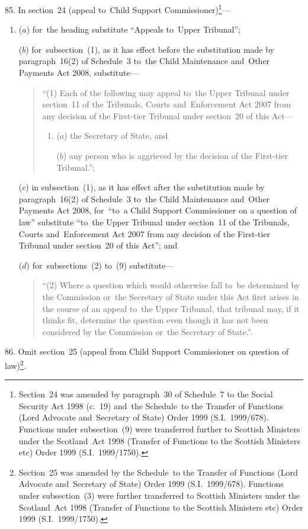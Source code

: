 \documentclass[12pt,a4paper]{article}
\begin{document}
85.  In section~24 (appeal to~Child Support Commissioner)\footnote{Section~24 was amended by paragraph~30 of Schedule~7 to the Social Security Act 1998 (c.~19) and~the Schedule~to the Transfer of Functions (Lord Advocate and~Secretary of State) Order 1999 (S.I.~1999/678). Functions under subsection~(9) were transferred further to Scottish Ministers under the Scotland~Act 1998 (Transfer of Functions to the Scottish Ministers etc) Order 1999 (S.I.~1999/1750).}—
\begin{enumerate}\item[]
($a$) for~the heading substitute “Appeals to~Upper Tribunal”;

($b$) for~subsection~(1), as it has effect before the substitution made by paragraph~16(2) of Schedule~3 to~the Child Maintenance and~Other Payments Act 2008, substitute—
\begin{quotation}
“(1) Each of the following may appeal to~the Upper Tribunal under section~11 of the Tribunals, Courts and~Enforcement Act 2007 from any decision of the First-tier Tribunal under section~20 of this Act—
\begin{enumerate}\item[]
($a$) the Secretary of State, and

($b$) any person who is aggrieved by the decision of the First-tier Tribunal.”;
\end{enumerate}
\end{quotation}

($c$) in subsection~(1), as it has effect after the substitution made by paragraph~16(2) of Schedule~3 to~the Child Maintenance and~Other Payments Act 2008, for~“to~a Child Support Commissioner on a question of law” substitute “to~the Upper Tribunal under section~11 of the Tribunals, Courts and~Enforcement Act 2007 from any decision of the First-tier Tribunal under section~20 of this Act”; and

($d$) for~subsections~(2) to~(9) substitute—
\begin{quotation}
“(2) Where a question which would otherwise fall to~be determined by the Commission or~the Secretary of State under this Act first arises in the course of an appeal to~the Upper Tribunal, that tribunal may, if it thinks fit, determine the question even though it has not been considered by the Commission or~the Secretary of State.”.
\end{quotation}
\end{enumerate}

\medskip

86.  Omit section~25 (appeal from Child Support Commissioner on question of law)\footnote{Section~25 was amended by the Schedule~to the Transfer of Functions (Lord Advocate and~Secretary of State) Order 1999 (S.I.~1999/678). Functions under subsection~(3) were further transferred to Scottish Ministers under the Scotland~Act 1998 (Transfer of Functions to the Scottish Ministers etc) Order 1999 (S.I.~1999/1750).}.
\end{document}
